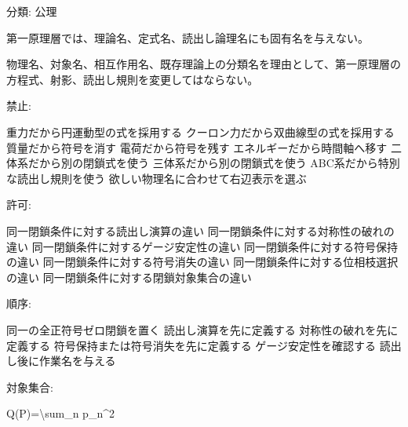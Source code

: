 \documentclass[
  a4paper,
]{ltjsarticle}
\newenvironment{Shaded}{}{}
\newcommand{\NormalTok}[1]{#1}
\begin{document}
分類: 公理

第一原理層では、理論名、定式名、読出し論理名にも固有名を与えない。

物理名、対象名、相互作用名、既存理論上の分類名を理由として、第一原理層の方程式、射影、読出し規則を変更してはならない。

禁止:

\begin{Shaded}
\begin{Highlighting}[]
\NormalTok{重力だから円運動型の式を採用する}
\NormalTok{クーロン力だから双曲線型の式を採用する}
\NormalTok{質量だから符号を消す}
\NormalTok{電荷だから符号を残す}
\NormalTok{エネルギーだから時間軸へ移す}
\NormalTok{二体系だから別の閉鎖式を使う}
\NormalTok{三体系だから別の閉鎖式を使う}
\NormalTok{ABC系だから特別な読出し規則を使う}
\NormalTok{欲しい物理名に合わせて右辺表示を選ぶ}
\end{Highlighting}
\end{Shaded}

許可:

\begin{Shaded}
\begin{Highlighting}[]
\NormalTok{同一閉鎖条件に対する読出し演算の違い}
\NormalTok{同一閉鎖条件に対する対称性の破れの違い}
\NormalTok{同一閉鎖条件に対するゲージ安定性の違い}
\NormalTok{同一閉鎖条件に対する符号保持の違い}
\NormalTok{同一閉鎖条件に対する符号消失の違い}
\NormalTok{同一閉鎖条件に対する位相枝選択の違い}
\NormalTok{同一閉鎖条件に対する閉鎖対象集合の違い}
\end{Highlighting}
\end{Shaded}

順序:

\begin{Shaded}
\begin{Highlighting}[]
\NormalTok{同一の全正符号ゼロ閉鎖を置く}
\NormalTok{読出し演算を先に定義する}
\NormalTok{対称性の破れを先に定義する}
\NormalTok{符号保持または符号消失を先に定義する}
\NormalTok{ゲージ安定性を確認する}
\NormalTok{読出し後に作業名を与える}
\end{Highlighting}
\end{Shaded}

対象集合:

\begin{Shaded}
\begin{Highlighting}[]
\NormalTok{Q(P)=\textbackslash{}sum\_n p\_n\^{}2}
\end{Highlighting}
\end{Shaded}
\end{document}
